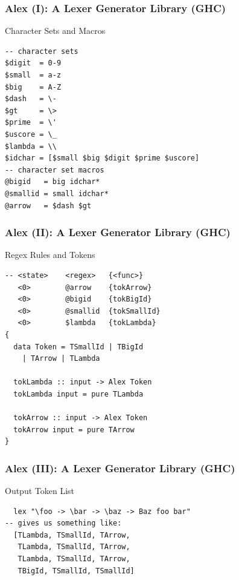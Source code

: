 \documentclass
  [hyperref={colorlinks = true,linkcolor = blue, 
             citecolor = blue, urlcolor = blue}
  ]{beamer}
\begin{document}
\begin{frame}[fragile]
\frametitle{Alex (I): A Lexer Generator Library (GHC)}
\begin{block}{Character Sets and Macros}
\begin{verbatim}
-- character sets
$digit  = 0-9
$small  = a-z
$big    = A-Z
$dash   = \-
$gt     = \>
$prime  = \'
$uscore = \_
$lambda = \\
$idchar = [$small $big $digit $prime $uscore]
-- character set macros
@bigid   = big idchar*
@smallid = small idchar*
@arrow   = $dash $gt
\end{verbatim}
\end{block}
\end{frame}

\begin{frame}[fragile]
\frametitle{Alex (II): A Lexer Generator Library (GHC)}
\begin{block}{Regex Rules and Tokens}
\begin{verbatim}
-- <state>    <regex>   {<func>}
   <0>        @arrow    {tokArrow}
   <0>        @bigid    {tokBigId}
   <0>        @smallid  {tokSmallId}
   <0>        $lambda   {tokLambda}
{
  data Token = TSmallId | TBigId
    | TArrow | TLambda

  tokLambda :: input -> Alex Token
  tokLambda input = pure TLambda

  tokArrow :: input -> Alex Token
  tokArrow input = pure TArrow
}
\end{verbatim}
\end{block}
\end{frame}

\begin{frame}[fragile]
\frametitle{Alex (III): A Lexer Generator Library (GHC)}
\begin{block}{Output Token List}
\begin{verbatim}
  lex "\foo -> \bar -> \baz -> Baz foo bar"
-- gives us something like:
  [TLambda, TSmallId, TArrow, 
   TLambda, TSmallId, TArrow, 
   TLambda, TSmallId, TArrow,
   TBigId, TSmallId, TSmallId]
\end{verbatim}
\end{block}
\end{frame}
\end{document}
